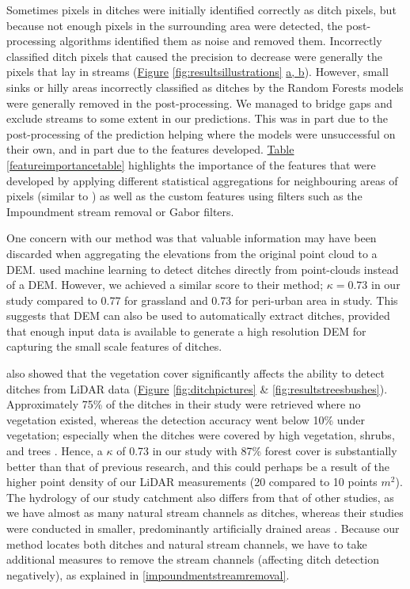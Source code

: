 \documentclass[11pt, review]{elsarticle} %
\begin{document}
Sometimes pixels in ditches were initially identified correctly as ditch pixels, but because not enough pixels in the surrounding area were detected, the post-processing algorithms identified them as noise and removed them. Incorrectly classified ditch pixels that caused the precision to decrease were generally the pixels that lay in streams (\hyperref[fig:resultsillustrations]{Figure} \ref{fig:resultsillustrations} \hyperref[fig:resultsillustrations]{a, b}). However, small sinks or hilly areas incorrectly classified as ditches by the Random Forests models were generally removed in the post-processing. We managed to bridge gaps and exclude streams to some extent in our predictions. This was in part due to the post-processing of the prediction helping where the models were unsuccessful on their own, and in part due to the features developed. \hyperref[featureimportancetable]{Table} \ref{featureimportancetable} highlights the importance of the features that were developed by applying different statistical aggregations for neighbouring areas of pixels (similar to \citet{roelens}) as well as the custom features using filters such as the Impoundment stream removal or Gabor filters.

One concern with our method was that valuable information may have been discarded when aggregating the elevations from the original point cloud to a DEM. \citet{roelens} used  machine learning to detect ditches directly from point-clouds instead of a DEM. However, we achieved a similar score to their method; $\kappa=0.73$ in our study compared to 0.77 for grassland and 0.73 for peri-urban area in \citet{roelens} study. This suggests that DEM can also be used to automatically extract ditches, provided that enough input data is available to generate a high resolution DEM for capturing the small scale features of ditches. 

\citet{bailly} also showed that the vegetation cover significantly affects the ability to detect ditches from LiDAR data (\hyperref[fig:ditchpictures]{Figure} \ref{fig:ditchpictures} \& \ref{fig:resultstreesbushes}). Approximately 75\% of the ditches in their study were retrieved where no vegetation existed, whereas the detection accuracy went below 10\% under vegetation; especially when the ditches were covered by high vegetation, shrubs, and trees \citep{bailly}. Hence, a $\kappa$ of 0.73 in our study  with  87\% forest cover \citep{krycklancatchment} is substantially better than that of previous research, and this could perhaps be a result of the higher point density of our LiDAR measurements (20 compared to 10 points $m^{2}$). The hydrology of our study catchment also differs from that of other studies, as we have almost as many natural stream channels as ditches, whereas their studies were conducted in smaller, predominantly artificially drained areas \citep{bailly, roelens, rapinel}. Because our method locates both ditches and natural stream channels, we have to take additional measures to remove the stream channels (affecting ditch detection negatively), as explained in \ref{impoundmentstreamremoval}.
\end{document}
